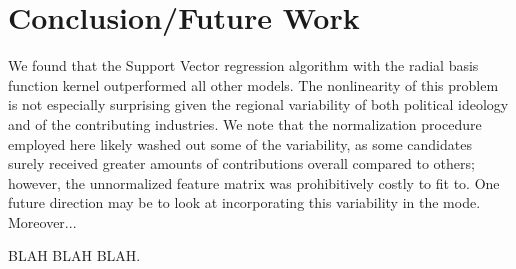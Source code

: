 \documentclass[12]{article}
\begin{document}
\section*{Conclusion/Future Work}


\noindent We found that the Support Vector regression algorithm with the radial basis function kernel outperformed all other models. The nonlinearity of this problem is not especially surprising given the regional variability of both political ideology and of the contributing industries. We note that the normalization procedure employed here likely washed out some of the variability, as some candidates surely received greater amounts of contributions overall compared to others; however, the unnormalized feature matrix was prohibitively costly to fit to. One future direction may be to look at incorporating this variability in the mode. Moreover...

BLAH BLAH BLAH. \\

\printbibliography
\end{document}
